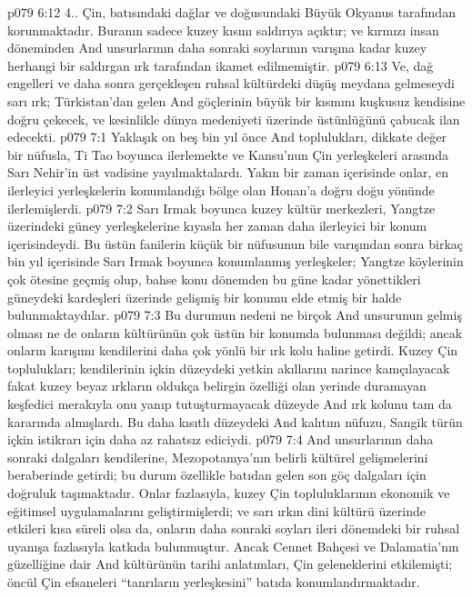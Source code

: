 \vs p079 6:12 4.\bibnobreakspace {}. Çin, batısındaki dağlar ve doğusundaki Büyük Okyanus tarafından korunmaktadır. Buranın sadece kuzey kısmı saldırıya açıktır; ve kırmızı insan döneminden And unsurlarının daha sonraki soylarının varışına kadar kuzey herhangi bir saldırgan ırk tarafından ikamet edilmemiştir.
\vs p079 6:13 Ve, dağ engelleri ve daha sonra gerçekleşen ruhsal kültürdeki düşüş meydana gelmeseydi sarı ırk; Türkistan’dan gelen And göçlerinin büyük bir kısmını kuşkusuz kendisine doğru çekecek, ve kesinlikle dünya medeniyeti üzerinde üstünlüğünü çabucak ilan edecekti.
\vs p079 7:1 Yaklaşık on beş bin yıl önce And toplulukları, dikkate değer bir nüfusla, Ti Tao boyunca ilerlemekte ve Kansu’nun Çin yerleşkeleri arasında Sarı Nehir’in üst vadisine yayılmaktalardı. Yakın bir zaman içerisinde onlar, en ilerleyici yerleşkelerin konumlandığı bölge olan Honan’a doğru doğu yönünde ilerlemişlerdi.
\vs p079 7:2 Sarı Irmak boyunca kuzey kültür merkezleri, Yangtze üzerindeki güney yerleşkelerine kıyasla her zaman daha ilerleyici bir konum içerisindeydi. Bu üstün fanilerin küçük bir nüfusunun bile varışından sonra birkaç bin yıl içerisinde Sarı Irmak boyunca konumlanmış yerleşkeler; Yangtze köylerinin çok ötesine geçmiş olup, bahse konu dönemden bu güne kadar yönettikleri güneydeki kardeşleri üzerinde gelişmiş bir konumu elde etmiş bir halde bulunmaktaydılar.
\vs p079 7:3 Bu durumun nedeni ne birçok And unsurunun gelmiş olması ne de onların kültürünün çok üstün bir konumda bulunması değildi; ancak onların karışımı kendilerini daha çok yönlü bir ırk kolu haline getirdi. Kuzey Çin toplulukları; kendilerinin içkin düzeydeki yetkin akıllarını narince kamçılayacak fakat kuzey beyaz ırkların oldukça belirgin özelliği olan yerinde duramayan keşfedici merakıyla onu yanıp tutuşturmayacak düzeyde And ırk kolunu tam da kararında almışlardı. Bu daha kısıtlı düzeydeki And kalıtım nüfuzu, Sangik türün içkin istikrarı için daha az rahatsız ediciydi.
\vs p079 7:4 And unsurlarının daha sonraki dalgaları kendilerine, Mezopotamya’nın belirli kültürel gelişmelerini beraberinde getirdi; bu durum özellikle batıdan gelen son göç dalgaları için doğruluk taşımaktadır. Onlar fazlasıyla, kuzey Çin topluluklarının ekonomik ve eğitimsel uygulamalarını geliştirmişlerdi; ve sarı ırkın dini kültürü üzerinde etkileri kısa süreli olsa da, onların daha sonraki soyları ileri dönemdeki bir ruhsal uyanışa fazlasıyla katkıda bulunmuştur. Ancak Cennet Bahçesi ve Dalamatia’nın güzelliğine dair And kültürünün tarihi anlatımları, Çin geleneklerini etkilemişti; öncül Çin efsaneleri “tanrıların yerleşkesini” batıda konumlandırmaktadır.

